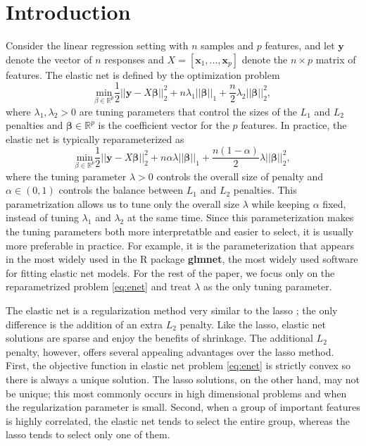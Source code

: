 \label{METHOD3}

\section{Introduction}

Consider the linear regression setting with $n$ samples and $p$ features, and let $\boldsymbol y$ denote the vector of $n$ responses and $X=[\boldsymbol x_1,...,\boldsymbol x_p]$ denote the $n\times p$ matrix of features. The elastic net \citep{zou2005regularization} is defined by the optimization problem 
\begin{equation}
    \label{eq:enet0}
    \underset{\beta\in \mathbb{R}^p}{\mathrm{min}}\frac{1}{2}||\boldsymbol y-X\boldsymbol\beta||_2^2+n\lambda_1||\boldsymbol\beta||_1+\frac{n}{2}\lambda_2||\boldsymbol\beta||_2^2,
\end{equation}
where $\lambda_1,\lambda_2> 0$ are tuning parameters that control the sizes of the $L_1$ and $L_2$ penalties and $\boldsymbol\beta\in\mathbb{R}^p$ is the coefficient vector for the $p$ features. In practice, the elastic net is typically reparameterized as
\begin{equation}
    \label{eq:enet}
    \underset{\beta\in \mathbb{R}^p}{\mathrm{min}}\frac{1}{2}||\boldsymbol y-X\boldsymbol\beta||_2^2+n\alpha\lambda||\boldsymbol\beta||_1+\frac{n(1-\alpha)}{2}\lambda||\boldsymbol\beta||_2^2,
\end{equation}
where the tuning parameter $\lambda>0$ controls the overall size of penalty and $\alpha\in(0,1)$ controls the balance between $L_1$ and $L_2$ penalties. This parametrization allows us to tune only the overall size $\lambda$ while keeping $\alpha$ fixed, instead of tuning $\lambda_1$ and $\lambda_2$ at the same time. Since this parameterization makes the tuning parameters both more interpretatble and easier to select, it is usually more preferable in practice. For example, it is the parameterization that appears in the most widely used in the R package \textbf{glmnet}, the most widely used software for fitting elastic net models. For the rest of the paper, we focus only on the reparametrized problem \eqref{eq:enet} and treat $\lambda$ as the only tuning parameter.

The elastic net is a regularization method very similar to the lasso \citep{tibshirani1996regression}; the only difference is the addition of an extra $L_2$ penalty. Like the lasso, elastic net solutions are sparse and enjoy the benefits of shrinkage. The additional $L_2$ penalty, however, offers several appealing advantages over the lasso method. First, the objective function in elastic net problem \eqref{eq:enet} is strictly convex so there is always a unique solution. The lasso solutions, on the other hand, may not be unique; this most commonly occurs in high dimensional problems and when the regularization parameter is small. Second, when a group of important features is highly correlated, the elastic net tends to select the entire group, whereas the lasso tends to select only one of them.

